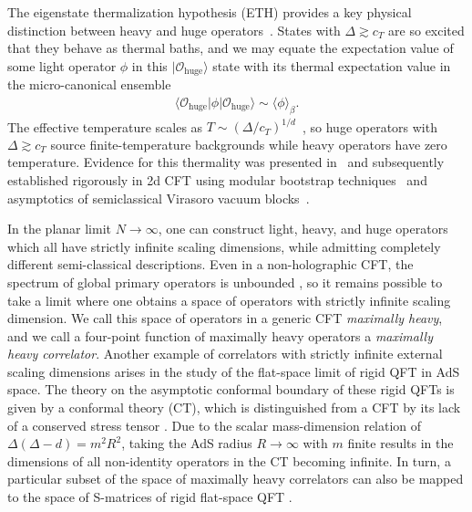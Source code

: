 \documentclass[a4paper,11pt]{article}
\theoremstyle{plain}
\theoremstyle{definition}
\theoremstyle{remark}
\newcommand{\cO}{\mathcal O}
\newcommand{\ba}{\begin{equation} \begin{aligned}}
\newcommand{\ea}{\end{aligned} \end{equation}}
\newcommand{\De}{\Delta}
\begin{document}
The eigenstate thermalization hypothesis (ETH) provides a key physical distinction between heavy and huge operators~\cite{Karlsson:2021duj}. States with $\De \gtrsim c_T$ are so excited that they behave as thermal baths, and we may equate the expectation value of some light operator $\phi$ in this $|\cO_{\text{huge}}\rangle$ state with its thermal expectation value in the micro-canonical ensemble
\ba
\langle \cO_{\text{huge}} | \phi |\cO_{\text{huge}} \rangle \sim \langle \phi\rangle_\beta.
\ea
The effective temperature scales as $T \sim (\De / c_T)^{1/d}$~\cite{Benjamin2023-qo,Asplund:2014coa}, so huge operators with $\De \gtrsim c_T$ source finite-temperature backgrounds while heavy operators have zero temperature. Evidence for this thermality was presented in~\cite{Asplund:2014coa} and subsequently established rigorously in 2d CFT using modular bootstrap techniques~\cite{Kraus:2016nwo,Das:2017vej} and asymptotics of semiclassical Virasoro vacuum blocks~\cite{Das:2020jhy,Fitzpatrick:2016ive}.

In the planar limit $N \to \infty$, one can construct light, heavy, and huge operators which all have strictly infinite scaling dimensions, while admitting completely different semi-classical descriptions. Even in a non-holographic CFT, the spectrum of global primary operators is unbounded \cite{Qiao:2017xif,Mukhametzhanov:2018zja}, so it remains possible to take a limit where one obtains a space of operators with strictly infinite scaling dimension. We call this space of operators in a generic CFT \textit{maximally heavy}, and we call a four-point function of maximally heavy operators a \textit{maximally heavy correlator}. Another example of correlators with strictly infinite external scaling dimensions arises in the study of the flat-space limit of rigid QFT in AdS space. The theory on the asymptotic conformal boundary of these rigid QFTs is given by a conformal theory (CT), which is distinguished from a CFT by its lack of a conserved stress tensor \cite{Paulos2016-mh}. Due to the scalar mass-dimension relation of $\De (\De - d) = m^2 R^2$, taking the AdS radius $R \to \infty$ with $m$ finite results in the dimensions of all non-identity operators in the CT becoming infinite. In turn, a particular subset of the space of maximally heavy correlators can also be mapped to the space of S-matrices of rigid flat-space QFT \cite{vanRees:2022zmr,Paulos2016-mh,vanRees:2023fcf,Penedones:2010ue}.
\end{document}
